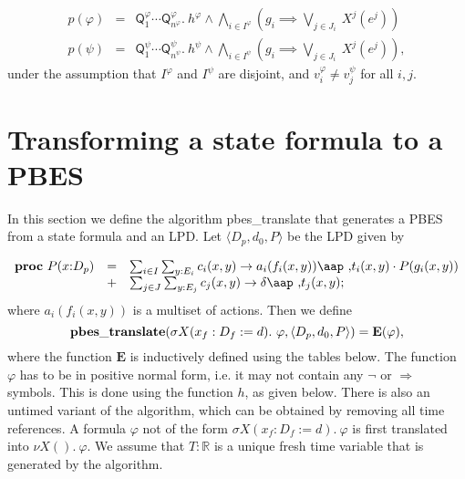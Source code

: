 \documentclass{article}
\begin{document}
\begin{equation*}
\begin{array}{lll}
p(\varphi ) & = & \mathsf{Q}_{1}^{\varphi }\cdots \mathsf{Q}_{n^{\varphi
}}^{\varphi }.~h^{\varphi }\wedge \bigwedge\limits_{i\in I^{\varphi }}\left(
g_{i}\implies \bigvee\limits_{j\in J_{i}}~X^{j}(e^{j})\right)  \\
p(\psi ) & = & \mathsf{Q}_{1}^{\psi }\cdots \mathsf{Q}_{n^{\psi }}^{\psi
}.~h^{\psi }\wedge \bigwedge\limits_{i\in I^{\psi }}\left( g_{i}\implies
\bigvee\limits_{j\in J_{i}}~X^{j}(e^{j})\right) ,%
\end{array}%
\end{equation*}%
under the assumption that $I^{\varphi }$ and $I^{\psi }$ are disjoint, and $%
v_{i}^{\varphi }\neq v_{j}^{\psi }$ for all $i,j$.\pagebreak

\section{Transforming a state formula to a PBES}

In this section we define the algorithm pbes\_translate that generates a
PBES from a state formula and an LPD. Let $\langle {D_p, d_0, P} \rangle $
be the LPD given by

\begin{equation*}
\begin{array}{lrl}
\mathbf{proc}~P(x{:}D_{p}) & = & \sum_{i\in
I}\sum_{y:E_{i}}c_{i}(x,y)\rightarrow a_{i}(f_{i}(x,y))\mbox{\aap ,}%
t_{i}(x,y)\cdot P(g_{i}(x,y)) \\
& + & \sum_{j\in J}\sum_{y:E_{j}}c_{j}(x,y)\rightarrow \delta \mbox{\aap ,}%
t_{j}(x,y);%
\end{array}%
\end{equation*}%
where $a_{i}(f_{i}(x,y))$ is a multiset of actions. Then we define
\begin{equation*}
\mathbf{pbes\_translate}(\sigma X(x_{f}:D_{f}:=d).~\varphi ,\langle {%
D_{p},d_{0},P}\rangle )=\mathbf{E}(\varphi ),
\end{equation*}%
where the function $\mathbf{E}$ is inductively defined using the tables
below. The function $\varphi $ has to be in positive normal form, i.e. it
may not contain any $\lnot $ or $\Rightarrow $ symbols. This is done using
the function $h$, as given below. There is also an untimed variant of the
algorithm, which can be obtained by removing all time references. A formula $%
\varphi $ not of the form $\sigma X(x_{f}:D_{f}:=d).~\varphi $ is first
translated into $\nu X().~\varphi $. We assume that $T:\mathbb{R}$ is a
unique fresh time variable that is generated by the algorithm.
\end{document}
